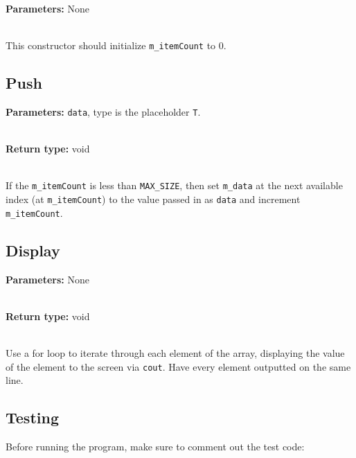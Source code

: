 \documentclass[a4paper,12pt,oneside]{book}
\begin{document}
    \textbf{Parameters:} None

    ~\\
    This constructor should initialize \texttt{m\_itemCount} to 0.
    
    \subsection{Push}

    \textbf{Parameters:} \texttt{data}, type is the placeholder \texttt{T}.

    ~\\
    \textbf{Return type:} void

    ~\\
    If the \texttt{m\_itemCount} is less than \texttt{MAX\_SIZE}, then
    set \texttt{m\_data} at the next available index (at \texttt{m\_itemCount})
    to the value passed in as \texttt{data} and increment \texttt{m\_itemCount}.
    
    \subsection{Display}
    
    \textbf{Parameters:} None
    
    ~\\
    \textbf{Return type:} void

    ~\\
    Use a for loop to iterate through each element of the array, displaying
    the value of the element to the screen via \texttt{cout}.
    Have every element outputted on the same line.

    \newpage
    \subsection{Testing}

    Before running the program, make sure to comment out the test code:
    
\end{document}
